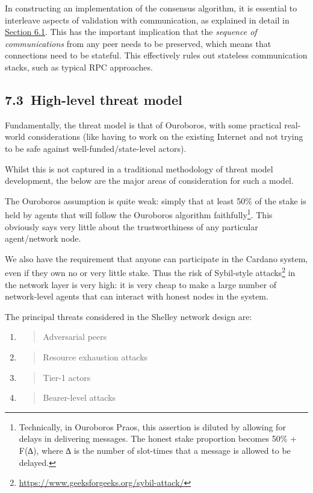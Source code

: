 \documentclass[11pt,a4paper]{article}
\begin{document}
In constructing an implementation of the consensus algorithm, it is
essential to interleave aspects of validation with communication, as
explained in detail in
\protect\hyperlink{consensus-constraints-and-design-decisions}{{Section
6.1}}. This has the important implication that the \emph{sequence of
communications} from any peer needs to be preserved, which means that
connections need to be stateful. This effectively rules out stateless
communication stacks, such as typical RPC approaches.

\hypertarget{high-level-threat-model}{%
\subsection{​7.3​~High-level threat
model}\label{high-level-threat-model}}

Fundamentally, the threat model is that of Ouroboros, with some
practical real-world considerations (like having to work on the existing
Internet and not trying to be safe against well-funded/state-level
actors).

Whilst this is not captured in a traditional methodology of threat model
development, the below are the major areas of consideration for such a
model.

The Ouroboros assumption is quite weak: simply that at least 50\% of the
stake is held by agents that will follow the Ouroboros algorithm
faithfully\footnote{Technically, in Ouroboros Praos, this assertion is
  diluted by allowing for delays in delivering messages. The honest
  stake proportion becomes 50\% + F(∆), where ∆ is the number of
  slot-times that a message is allowed to be delayed.}. This obviously
says very little about the trustworthiness of any particular
agent/network node.

We also have the requirement that anyone can participate in the Cardano
system, even if they own no or very little stake. Thus the risk of
Sybil-style attacks\footnote{\href{https://www.geeksforgeeks.org/sybil-attack/}{{https://www.geeksforgeeks.org/sybil-attack/}}}
in the network layer is very high: it is very cheap to make a large
number of network-level agents that can interact with honest nodes in
the system.

The principal threats considered in the Shelley network design are:

\begin{enumerate}
\def\labelenumi{\arabic{enumi}.}
\item
  \begin{quote}
  Adversarial peers
  \end{quote}
\item
  \begin{quote}
  Resource exhaustion attacks
  \end{quote}
\item
  \begin{quote}
  Tier-1 actors
  \end{quote}
\item
  \begin{quote}
  Bearer-level attacks
  \end{quote}
\end{enumerate}
\end{document}
